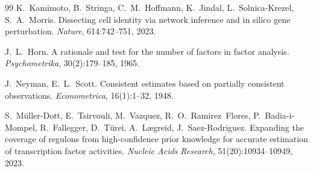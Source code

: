 \documentclass[a4paper, 11pt]{article}
\theoremstyle{plain}
\theoremstyle{remark}
\begin{document}
\begin{thebibliography}{99}
K.~Kamimoto, B.~Stringa, C.~M.~Hoffmann, K.~Jindal, L.~Solnica-Krezel, S.~A.~Morris.
\newblock Dissecting cell identity via network inference and in silico gene perturbation.
\newblock \emph{Nature}, 614:742--751, 2023.

J.~L.~Horn.
\newblock A rationale and test for the number of factors in factor analysis.
\newblock \emph{Psychometrika}, 30(2):179--185, 1965.

J.~Neyman, E.~L.~Scott.
\newblock Consistent estimates based on partially consistent observations.
\newblock \emph{Econometrica}, 16(1):1--32, 1948.

S.~Müller-Dott, E.~Tsirvouli, M.~Vazquez, R.~O.~Ramirez~Flores, P.~Badia-i-Mompel, R.~Fallegger, D.~Türei, A.~Lægreid, J.~Saez-Rodriguez.
\newblock Expanding the coverage of regulons from high-confidence prior knowledge for accurate estimation of transcription factor activities.
\newblock \emph{Nucleic Acids Research}, 51(20):10934--10949, 2023.

\end{thebibliography}
\end{document}

